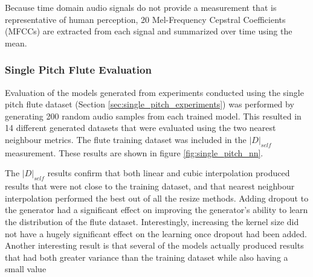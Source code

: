 Because time domain audio signals do not provide a measurement that is representative of human perception, 20 Mel-Frequency Cepstral Coefficients (MFCCs) are extracted from each signal and summarized over time using the mean.

\subsubsection{Single Pitch Flute Evaluation}
Evaluation of the models generated from experiments conducted using the single pitch flute dataset (Section \ref{sec:single_pitch_experiments}) was performed by generating 200 random audio samples from each trained model. This resulted in 14 different generated datasets that were evaluated using the two nearest neighbour metrics. The flute training dataset was included in the $|D|_{self}$ measurement. These results are shown in figure \ref{fig:single_pitch_nn}. 

The $|D|_{self}$ results confirm that both linear and cubic interpolation produced results that were not close to the training dataset, and that nearest neighbour interpolation performed the best out of all the resize methods. Adding dropout to the generator had a significant effect on improving the generator's ability to learn the distribution of the flute dataset. Interestingly, increasing the kernel size did not have a hugely significant effect on the learning once dropout had been added. Another interesting result is that several of the models actually produced results that had both greater variance than the training dataset while also having a small value 

